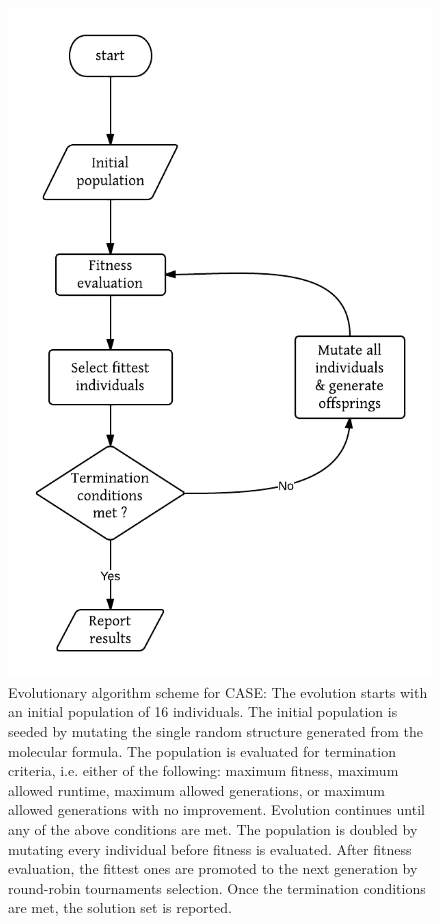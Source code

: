 \documentclass[10pt]{bmc_article}
\newenvironment{bmcformat}{\begin{raggedright}\baselineskip20pt\sloppy\setboolean{publ}{false}}{\end{raggedright}\baselineskip20pt\sloppy}
\begin{document}
\begin{bmcformat}
\begin{figure}[hbt]
  \centering
  	\includegraphics[angle=0,clip=false,scale=0.5]{pics/EAprocedure.png}
	
  \caption{Evolutionary algorithm scheme for CASE: The evolution starts with an initial population of 16 individuals. The initial population is seeded by mutating the single random structure generated from the molecular formula. The population is evaluated for termination criteria, i.e. either of the following: maximum fitness, maximum allowed runtime, maximum allowed generations, or maximum allowed generations with no improvement. Evolution continues until any of the above conditions are met. The population is doubled by mutating every individual before fitness is evaluated. After fitness evaluation, the fittest ones are promoted to the next generation by round-robin tournaments selection. Once the termination conditions are met, the solution set is reported.}
   

\end{figure}
\end{bmcformat}
\end{document}
